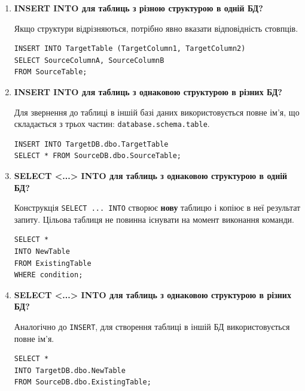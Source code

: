 \documentclass{article}
\begin{document}
\begin{enumerate}[label=\arabic*., leftmargin=*]
        \item \textbf{INSERT INTO для таблиць з різною структурою в одній БД?}
        
        Якщо структури відрізняються, потрібно явно вказати відповідність стовпців.
        \begin{CodeBox}
        \begin{verbatim}
INSERT INTO TargetTable (TargetColumn1, TargetColumn2)
SELECT SourceColumnA, SourceColumnB 
FROM SourceTable;
        \end{verbatim}
        \end{CodeBox}

        \item \textbf{INSERT INTO для таблиць з однаковою структурою в різних БД?}
        
        Для звернення до таблиці в іншій базі даних використовується повне ім'я, що складається з трьох частин: \texttt{database.schema.table}.
        \begin{CodeBox}
        \begin{verbatim}
INSERT INTO TargetDB.dbo.TargetTable
SELECT * FROM SourceDB.dbo.SourceTable;
        \end{verbatim}
        \end{CodeBox}
        
        \item \textbf{SELECT <...> INTO для таблиць з однаковою структурою в одній БД?}
        
        Конструкція \texttt{SELECT ... INTO} створює \textbf{нову} таблицю і копіює в неї результат запиту. Цільова таблиця не повинна існувати на момент виконання команди.
        \begin{CodeBox}
        \begin{verbatim}
SELECT *
INTO NewTable
FROM ExistingTable
WHERE condition;
        \end{verbatim}
        \end{CodeBox}

        \item \textbf{SELECT <...> INTO для таблиць з однаковою структурою в різних БД?}
        
        Аналогічно до \texttt{INSERT}, для створення таблиці в іншій БД використовується повне ім'я.
        \begin{CodeBox}
        \begin{verbatim}
SELECT *
INTO TargetDB.dbo.NewTable
FROM SourceDB.dbo.ExistingTable;
        \end{verbatim}
        \end{CodeBox}
        

\end{enumerate}
\end{document}
